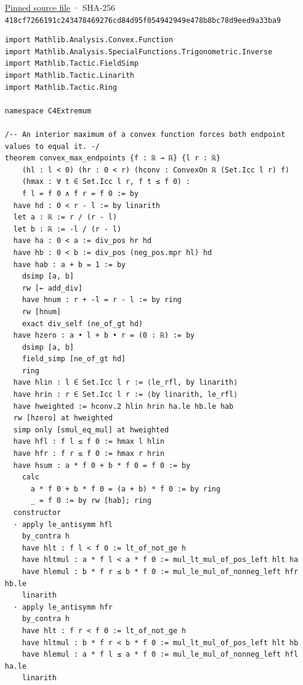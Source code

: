 \documentclass[11pt,a4paper]{article}
\begin{document}
\href{https://github.com/mpelteshki/climbing-to-the-frontier/blob/29fbb70da18564048f62492e43870f2f96a65463/cagent/p1/C4Extremum.lean}{Pinned source file} · SHA-256 \texttt{418cf726\allowbreak{}6191c243\allowbreak{}47846927\allowbreak{}6cd84d95\allowbreak{}f0549429\allowbreak{}49e478b8\allowbreak{}bc78d9ee\allowbreak{}d9a33ba9}

\begin{Verbatim}[breaklines,breakanywhere,fontsize=\footnotesize]
import Mathlib.Analysis.Convex.Function
import Mathlib.Analysis.SpecialFunctions.Trigonometric.Inverse
import Mathlib.Tactic.FieldSimp
import Mathlib.Tactic.Linarith
import Mathlib.Tactic.Ring

namespace C4Extremum

/-- An interior maximum of a convex function forces both endpoint values to equal it. -/
theorem convex_max_endpoints {f : ℝ → ℝ} {l r : ℝ}
    (hl : l < 0) (hr : 0 < r) (hconv : ConvexOn ℝ (Set.Icc l r) f)
    (hmax : ∀ t ∈ Set.Icc l r, f t ≤ f 0) :
    f l = f 0 ∧ f r = f 0 := by
  have hd : 0 < r - l := by linarith
  let a : ℝ := r / (r - l)
  let b : ℝ := -l / (r - l)
  have ha : 0 < a := div_pos hr hd
  have hb : 0 < b := div_pos (neg_pos.mpr hl) hd
  have hab : a + b = 1 := by
    dsimp [a, b]
    rw [← add_div]
    have hnum : r + -l = r - l := by ring
    rw [hnum]
    exact div_self (ne_of_gt hd)
  have hzero : a • l + b • r = (0 : ℝ) := by
    dsimp [a, b]
    field_simp [ne_of_gt hd]
    ring
  have hlin : l ∈ Set.Icc l r := ⟨le_rfl, by linarith⟩
  have hrin : r ∈ Set.Icc l r := ⟨by linarith, le_rfl⟩
  have hweighted := hconv.2 hlin hrin ha.le hb.le hab
  rw [hzero] at hweighted
  simp only [smul_eq_mul] at hweighted
  have hfl : f l ≤ f 0 := hmax l hlin
  have hfr : f r ≤ f 0 := hmax r hrin
  have hsum : a * f 0 + b * f 0 = f 0 := by
    calc
      a * f 0 + b * f 0 = (a + b) * f 0 := by ring
      _ = f 0 := by rw [hab]; ring
  constructor
  · apply le_antisymm hfl
    by_contra h
    have hlt : f l < f 0 := lt_of_not_ge h
    have hltmul : a * f l < a * f 0 := mul_lt_mul_of_pos_left hlt ha
    have hlemul : b * f r ≤ b * f 0 := mul_le_mul_of_nonneg_left hfr hb.le
    linarith
  · apply le_antisymm hfr
    by_contra h
    have hlt : f r < f 0 := lt_of_not_ge h
    have hltmul : b * f r < b * f 0 := mul_lt_mul_of_pos_left hlt hb
    have hlemul : a * f l ≤ a * f 0 := mul_le_mul_of_nonneg_left hfl ha.le
    linarith


\end{Verbatim}
\end{document}
